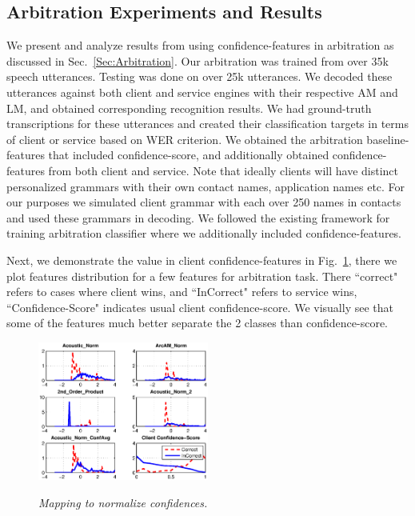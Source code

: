 
\subsection{Arbitration Experiments and Results}\label{Sec:ArbitrationResults}
We present and analyze results from using confidence-features in arbitration as discussed in Sec.~\ref{Sec:Arbitration}.
Our arbitration was trained from over 35k speech utterances. Testing was done on over 25k utterances. 
We decoded these utterances against both client and service engines with their respective  AM and LM, and obtained corresponding recognition results. We had ground-truth transcriptions for these utterances and created their classification targets in terms of client or service based on WER criterion. We obtained the arbitration baseline-features that included confidence-score, and additionally obtained confidence-features from both client and service. Note that ideally clients will have distinct personalized grammars with their own contact names, application names etc. For our purposes we simulated client grammar with each over 250 names in contacts and used these grammars in decoding. We followed the existing framework for training arbitration classifier where we additionally included confidence-features.

Next, we demonstrate the value in client confidence-features in Fig.~\ref{Fig:PhrasePreds-Hist}, there we plot features distribution for a few features for arbitration task. There ``correct" refers to cases where client wins, and ``InCorrect" refers to service wins, ``Confidence-Score" indicates usual client confidence-score. We visually see that some of the features much better separate the 2 classes than confidence-score.

\begin{figure}[h]
\centering
{\includegraphics[width=0.5\textwidth]{PhrasePreds-Hist.eps}}
\caption{\it Mapping to normalize confidences.}
\label{Fig:PhrasePreds-Hist}
\end{figure}

